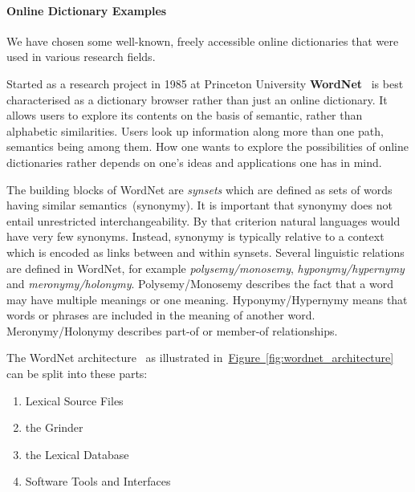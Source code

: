 \paragraph{Online Dictionary Examples} We have chosen some well-known, freely accessible online dictionaries that were used in various research
fields.

Started as a research project in 1985 at Princeton University \textbf{WordNet}~\cite{fellbaum1998} is best characterised as a dictionary browser rather than just an online dictionary. It allows users to explore its contents on the basis of semantic, rather than alphabetic similarities. Users look up information along more than one path, semantics being among them. How one wants to explore the possibilities of online dictionaries rather depends on one's ideas and applications one has in mind. 

The building blocks of WordNet are \textit{synsets} which are defined as sets of words having similar semantics~(synonymy). It is important that synonymy does not entail unrestricted interchangeability. By that criterion natural languages would have very few synonyms. Instead, synonymy is typically relative to a context which is encoded as links between and within synsets. 
Several linguistic relations are defined in WordNet, for example \textit{polysemy/monosemy}, \textit{hyponymy/hypernymy} and \textit{meronymy/holonymy}. 
Polysemy/Monosemy describes the fact that a word may have multiple meanings or one meaning. Hyponymy/Hypernymy means that words or phrases are included in the meaning of another word. Meronymy/Holonymy describes part-of or member-of relationships.

The WordNet architecture~\cite{fellbaum1998} as illustrated in~\hyperref[fig:wordnet_architecture]{Figure~\ref*{fig:wordnet_architecture}} can be split into these parts:
\begin{enumerate}
		\item Lexical Source Files
		\item the Grinder
		\item the Lexical Database
		\item Software Tools and Interfaces
\end{enumerate}

